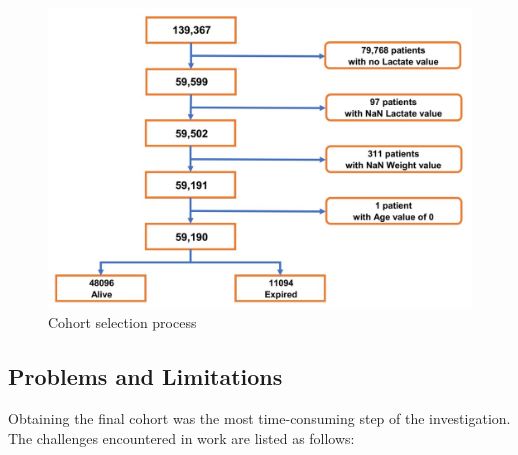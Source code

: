 \begin{table}[ht]
\centering
\setlength\tabcolsep{8pt}
\caption{\label{tab:cohorttemplate}Selected features for our dataset}
\end{table}

\begin{figure}[ht]
\centering
\includegraphics[width=15cm]{fig/chapter3/Cohort Selection Process.jpg}
\caption{Cohort selection process}
\label{fig:cohortselection}
\end{figure}

\subsection{Problems and Limitations}{\label{ssec:limit}}
Obtaining the final cohort was the most time-consuming step of the investigation. The challenges encountered in work are listed as follows: \

